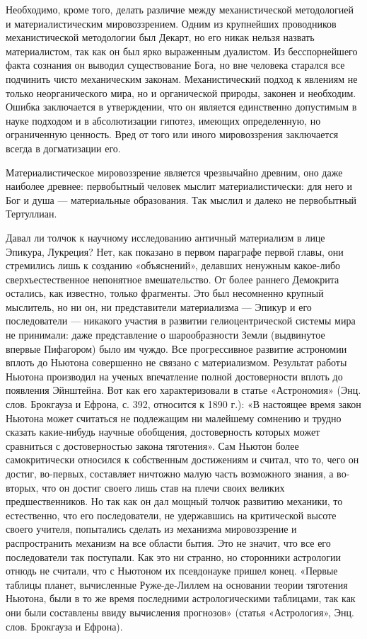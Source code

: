 Необходимо, кроме того, делать различие между механистической методологией и
материалистическим мировоззрением. Одним из крупнейших проводников
механистической методологии был Декарт, но его никак нельзя назвать
материалистом, так как он был ярко выраженным дуалистом. Из бесспорнейшего
факта сознания он выводил существование Бога, но вне человека старался все
подчинить чисто механическим законам. Механистический подход к явлениям не
только неорганического мира, но и органической природы, законен и необходим.
Ошибка заключается в утверждении, что он является единственно допустимым в
науке подходом и в абсолютизации гипотез, имеющих определенную, но ограниченную
ценность. Вред от того или иного мировоззрения заключается всегда в
догматизации его.

Материалистическое мировоззрение является чрезвычайно древним, оно даже
наиболее древнее: первобытный человек мыслит материалистически: для него и Бог
и душа --- материальные образования. Так мыслил и далеко не первобытный
Тертуллиан.

Давал ли толчок к научному исследованию античный материализм в лице Эпикура,
Лукреция? Нет, как показано в первом параграфе первой главы, они стремились
лишь к созданию «объяснений», делавших ненужным какое-либо сверхъестественное
непонятное вмешательство. От более раннего Демокрита остались, как известно,
только фрагменты. Это был несомненно крупный мыслитель, но ни он, ни
представители материализма --- Эпикур и его последователи --- никакого участия
в развитии гелиоцентрической системы мира не принимали: даже представление о
шарообразности Земли (выдвинутое впервые Пифагором) было им чуждо. Все
прогрессивное развитие астрономии вплоть до Ньютона совершенно не связано с
материализмом. Результат работы Ньютона производил на ученых впечатление полной
достоверности вплоть до появления Эйнштейна. Вот как его характеризовали в
статье «Астрономия» (Энц. слов. Брокгауза и Ефрона, с. 392, относится к 1890
г.): «В настоящее время закон Ньютона может считаться не подлежащим ни
малейшему сомнению и трудно сказать какие-нибудь научные обобщения,
достоверность которых может сравниться с достоверностью закона тяготения». Сам
Ньютон более самокритически относился к собственным достижениям и считал, что
то, чего он достиг, во-первых, составляет ничтожно малую часть возможного
знания, а во-вторых, что он достиг своего лишь став на плечи своих великих
предшественников. Но так как он дал мощный толчок развитию механики, то
естественно, что его последователи, не удержавшись на критической высоте своего
учителя, попытались сделать из механизма мировоззрение и распространить
механизм на все области бытия. Это не значит, что все его последователи так
поступали. Как это ни странно, но сторонники астрологии отнюдь не считали, что
с Ньютоном их псевдонауке пришел конец. «Первые таблицы планет, вычисленные
Руже-де-Лиллем на основании теории тяготения Ньютона, были в то же время
последними астрологическими таблицами, так как они были составлены ввиду
вычисления прогнозов» (статья «Астрология», Энц. слов. Брокгауза и Ефрона).

